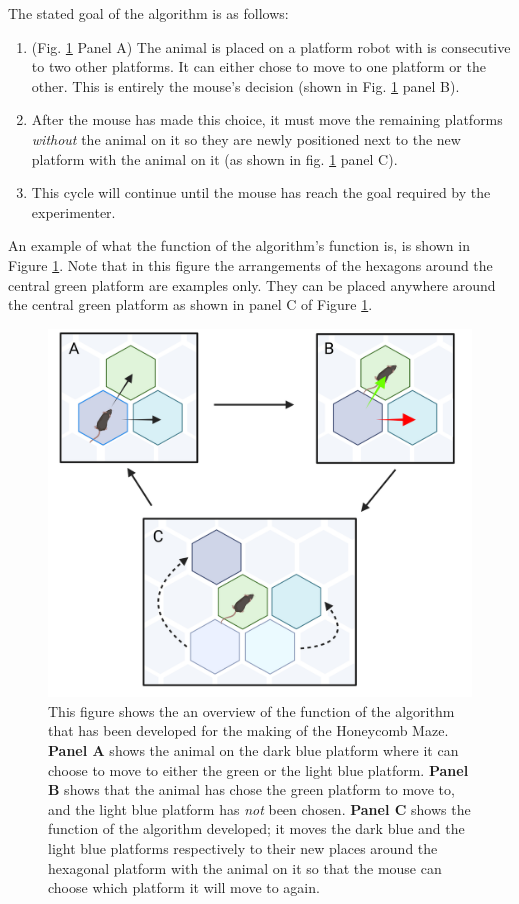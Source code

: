 The stated goal of the algorithm is as follows:
\begin{enumerate}
    \item(Fig. \ref{fig:example_algorithm} Panel A) The animal is placed on a platform robot with is consecutive to two other platforms. It can either chose to move to one platform or the other. This is entirely the mouse's decision (shown in Fig. \ref{fig:example_algorithm} panel B).
    \item After the mouse has made this choice, it must move the remaining platforms \textit{without} the animal on it so they are newly positioned next to the new platform with the animal on it (as shown in fig. \ref{fig:example_algorithm} panel C).
    \item This cycle will continue until the mouse has reach the goal required by the experimenter.
\end{enumerate}

An example of what the function of the algorithm's function is, is shown in Figure \ref{fig:example_algorithm}. Note that in this figure the arrangements of the hexagons around the central green platform are examples only. They can be placed anywhere around the central green platform as shown in panel C of Figure \ref{fig:example_algorithm}.

\begin{figure}[H]
    \centering
    \includegraphics[scale=0.6]{images/example_algorithm.png}
    \caption{This figure shows the an overview of the function of the algorithm that has been developed for the making of the Honeycomb Maze. \textbf{Panel A} shows the animal on the dark blue platform where it can choose to move to either the green or the light blue platform. \textbf{Panel B} shows that the animal has chose the green platform to move to, and the light blue platform has \textit{not} been chosen. \textbf{Panel C} shows the function of the algorithm developed; it moves the dark blue and the light blue platforms respectively to their new places around the hexagonal platform with the animal on it so that the mouse can choose which platform it will move to again.}
    \label{fig:example_algorithm}
\end{figure}


